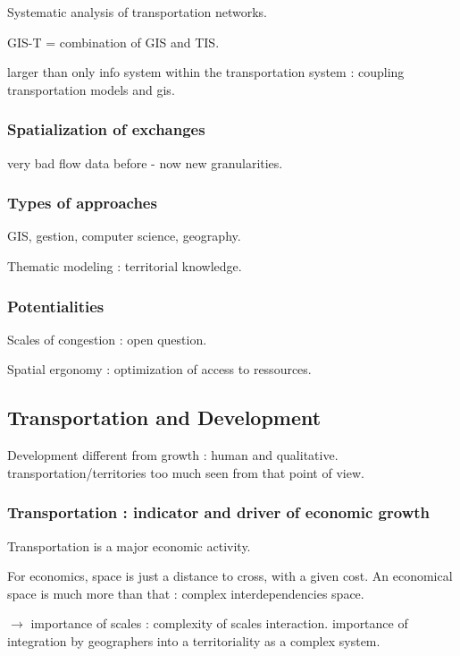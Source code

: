 Systematic analysis of transportation networks. 

GIS-T = combination of GIS and TIS.

larger than only info system within the transportation system : coupling transportation models and gis.

\subsubsection{Spatialization of exchanges}

very bad flow data before - now new granularities.

\subsubsection{Types of approaches}

GIS, gestion, computer science, geography.

Thematic modeling : territorial knowledge.

\subsubsection{Potentialities}

Scales of congestion : open question.

Spatial ergonomy : optimization of access to ressources.



\subsection{Transportation and Development}

Development different from growth : human and qualitative. transportation/territories too much seen from that point of view.

\subsubsection{Transportation : indicator and driver of economic growth}

Transportation is a major economic activity.

For economics, space is just a distance to cross, with a given cost. An economical space is much more than that : complex interdependencies space.

$\rightarrow$ importance of scales : complexity of scales interaction. importance of integration by geographers into a territoriality as a complex system.


